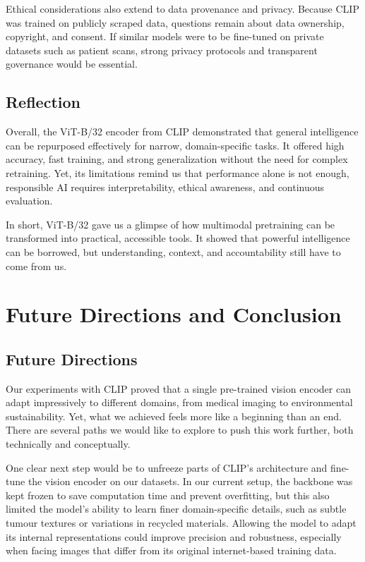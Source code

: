 \documentclass[12pt]{article}
\begin{document}
Ethical considerations also extend to data provenance and privacy. Because CLIP was trained on publicly scraped data, questions remain about data ownership, copyright, and consent. If similar models were to be fine-tuned on private datasets such as patient scans, strong privacy protocols and transparent governance would be essential.

\subsection{Reflection}
Overall, the ViT-B/32 encoder from CLIP demonstrated that general intelligence can be repurposed effectively for narrow, domain-specific tasks. It offered high accuracy, fast training, and strong generalization without the need for complex retraining. Yet, its limitations remind us that performance alone is not enough, responsible AI requires interpretability, ethical awareness, and continuous evaluation.  
\vspace{0.3em}

In short, ViT-B/32 gave us a glimpse of how multimodal pretraining can be transformed into practical, accessible tools. It showed that powerful intelligence can be borrowed, but understanding, context, and accountability still have to come from us.

\section{Future Directions and Conclusion}

\subsection{Future Directions}
Our experiments with CLIP proved that a single pre-trained vision encoder can adapt impressively to different domains, from medical imaging to environmental sustainability. Yet, what we achieved feels more like a beginning than an end. There are several paths we would like to explore to push this work further, both technically and conceptually.

One clear next step would be to unfreeze parts of CLIP’s architecture and fine-tune the vision encoder on our datasets. In our current setup, the backbone was kept frozen to save computation time and prevent overfitting, but this also limited the model’s ability to learn finer domain-specific details, such as subtle tumour textures or variations in recycled materials. Allowing the model to adapt its internal representations could improve precision and robustness, especially when facing images that differ from its original internet-based training data.
\end{document}
